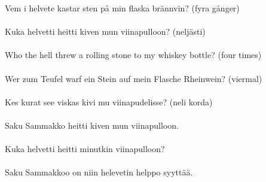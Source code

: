 
            Vem i helvete kastar sten på min flaska brännvin? (fyra gånger) \\
\hspace{10mm} \\
            Kuka helvetti heitti kiven mun viinapulloon? (neljästi) \\
\hspace{10mm} \\
            Who the hell threw a rolling stone to my whiskey bottle? (four times) \\
\hspace{10mm} \\
            Wer zum Teufel warf ein Stein auf mein Flasche Rheinwein? (viermal) \\
\hspace{10mm} \\
            Kes kurat see viskas kivi mu viinapudelisse? (neli korda) \\
\hspace{10mm} \\
            Saku Sammakko heitti kiven mun viinapulloon. \\
\hspace{10mm} \\
            Kuka helvetti heitti minutkin viinapulloon? \\
\hspace{10mm} \\
            Saku Sammakkoo on niin helevetin helppo syyttää. \\
